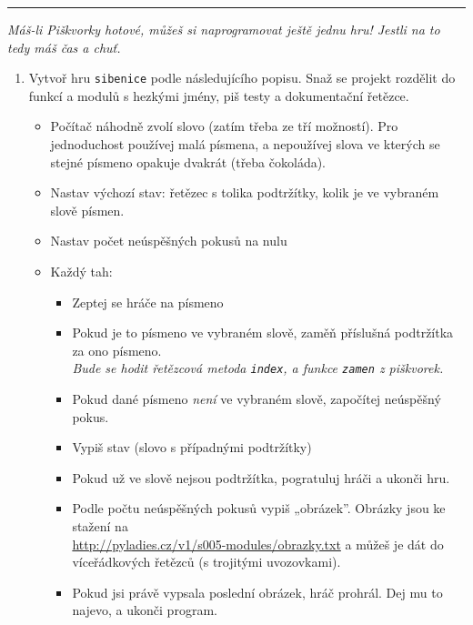 \documentclass[a4paper,10pt]{article}
\newcommand\startsection[1]{
     \vspace{0.2ex}
    \hrule
    {\fontspec{Oxygen} \tiny
     \vspace{-1ex}
     \emph{#1}
     \vspace{-1.5em}
    }
}
\begin{document}
\newpage

\startsection{Máš-li Piškvorky hotové, můžeš si naprogramovat ještě jednu hru! Jestli na to tedy máš čas a chuť.}

\begin{enumerate}[resume]

\item Vytvoř hru \texttt{sibenice} podle následujícího popisu.
    Snaž se projekt rozdělit do funkcí a modulů s hezkými jmény,
    piš testy a dokumentační řetězce.

    \begin{itemize}
        \item Počítač náhodně zvolí slovo (zatím třeba ze tří možností).
            Pro jednoduchost používej malá písmena, a nepoužívej slova
            ve kterých se stejné písmeno opakuje dvakrát
            (třeba č\textcolor{plpink}{o}k\textcolor{plpink}{o}láda).
        \item Nastav výchozí stav: řetězec s tolika podtržítky, kolik je
             ve vybraném slově písmen.
        \item Nastav počet neúspěšných pokusů na nulu
        \item Každý tah:
            \begin{itemize}
                \item Zeptej se hráče na písmeno
                \item Pokud je to písmeno ve vybraném slově, zaměň příslušná
                    podtržítka za ono písmeno.
                    \\\emph{\small Bude se hodit řetězcová metoda \texttt{index},
                    a funkce \texttt{zamen} z piškvorek.}
                \item Pokud dané písmeno \emph{není} ve vybraném slově,
                    započítej neúspěšný pokus.
                \item Vypiš stav (slovo s případnými podtržítky)
                \item Pokud už ve slově nejsou podtržítka, pogratuluj hráči
                    a ukonči hru.
                \item Podle počtu neúspěšných pokusů vypiš „obrázek”.
                    Obrázky jsou ke stažení na \\\url{http://pyladies.cz/v1/s005-modules/obrazky.txt}
                    a můžeš je dát do víceřádkových řetězců (s trojitými uvozovkami).
                \item Pokud jsi právě vypsala poslední obrázek, hráč prohrál.
                    Dej mu to najevo, a ukonči program.
            \end{itemize}
    \end{itemize}


\end{enumerate}
\end{document}
